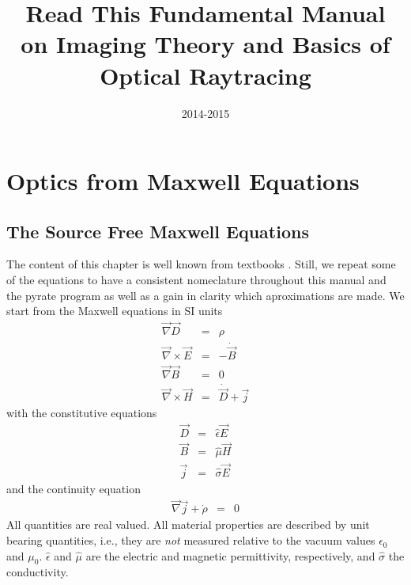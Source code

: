\documentclass[12pt,a4paper,twoside,openright,BCOR10mm,headsepline,titlepage,abstracton,chapterprefix,final]{scrreprt}
\newcommand\vacuum{0}
\newcommand\Vector[1]{\vec{#1}}
\newcommand\Nabla{\Vector{\nabla}}
\newcommand\timederivative[1]{\dot{{#1}}}
\newcommand\Tensor[1]{\hat{#1}}
\newcommand\scalarEfield{E}
\newcommand\scalarBfield{B}
\newcommand\scalarHfield{H}
\newcommand\scalarDfield{D}
\newcommand\Efield{\Vector{\scalarEfield}}
\newcommand\Bfield{\Vector{\scalarBfield}}
\newcommand\Hfield{\Vector{\scalarHfield}}
\newcommand\Dfield{\Vector{\scalarDfield}}
\newcommand\permeability{\Tensor{\mu}}
\newcommand\vacuumpermeability{\mu_{\vacuum}}
\newcommand\permittivity{\Tensor{\epsilon}}
\newcommand\vacuumpermittivity{\epsilon_{\vacuum}}
\newcommand\conductivity{\Tensor{\sigma}}
\newcommand\currentdensity{\Vector{j}}
\newcommand\chargedensity{\rho}
\begin{document}
\titlehead{ }
\subject{Pyrate -- Optical raytracing based on Python}
\title{Read This Fundamental Manual \\ on Imaging Theory and Basics of Optical Raytracing}
\author{}
\date{2014-2015}
\publishers{}
\maketitle

\onehalfspacing

\tableofcontents

\chapter{Optics from Maxwell Equations}
\section{The Source Free Maxwell Equations}
The content of this chapter is well known from textbooks \cite{Jackson}. Still, we repeat some of the equations to have a consistent nomeclature throughout this manual and the pyrate program
as well as a gain in clarity which aproximations are made.
We start from the Maxwell equations in SI units
\begin{subequations}\label{eq:Maxwell}
\begin{eqnarray}
  \Nabla \Dfield &=& \chargedensity 							\label{eq:MaxwellNablaD}\\
  \Nabla \times \Efield &=& - \timederivative{\Bfield}  					\label{eq:MaxwellNablaCrossE}\\
  \Nabla \Bfield &=& 0  									\label{eq:MaxwellNablaB}\\
  \Nabla \times \Hfield &=& \timederivative{\Dfield} + \currentdensity  		\label{eq:MaxwellNablaCrossH}
\end{eqnarray}
\end{subequations}
with the constitutive equations
\begin{subequations}\label{eq:Material}
\begin{eqnarray}
  \Dfield &=& \permittivity \Efield 								\label{eq:ConstitutiveEpsilon}\\
  \Bfield &=& \permeability \Hfield 								\label{eq:ConstitutiveMu}\\
  \currentdensity &=& \conductivity \Efield						\label{eq:ConstitutiveSigma}
\end{eqnarray}
\end{subequations}
and the continuity equation
\begin{eqnarray}
  \Nabla \currentdensity + \timederivative{\chargedensity} &=& 0		\label{eq:continuity}
\end{eqnarray}
All quantities are real valued.
All material properties are described by unit bearing quantities, i.e., they are \emph{not} measured relative to the vacuum values $\vacuumpermittivity$ and $\vacuumpermeability$. $\permittivity$ and $\permeability$ are the electric and magnetic permittivity, respectively, and $\conductivity$ the conductivity. 
\end{document}
